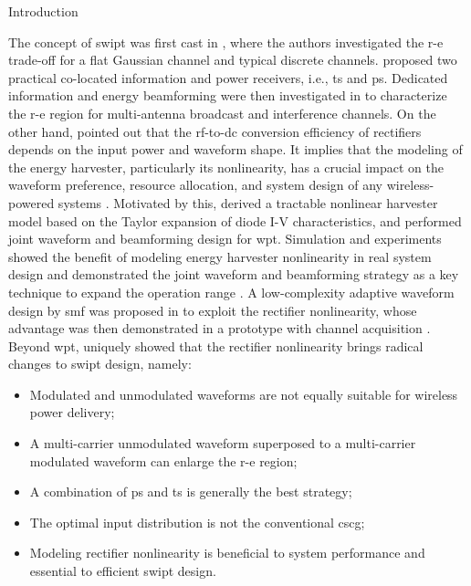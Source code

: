 \begin{section}{Introduction}
\begin{subsection}{}
		The concept of \gls{swipt} was first cast in \cite{Varshney2008}, where the authors investigated the \gls{r-e} trade-off for a flat Gaussian channel and typical discrete channels. \cite{Zhou2013} proposed two practical co-located information and power receivers, i.e., \gls{ts} and \gls{ps}. Dedicated information and energy beamforming were then investigated in \cite{Zhang2013,Park2014} to characterize the \gls{r-e} region for multi-antenna broadcast and interference channels. On the other hand, \cite{Trotter2009} pointed out that the \gls{rf}-to-\gls{dc} conversion efficiency of rectifiers depends on the input power and waveform shape. It implies that the modeling of the energy harvester, particularly its nonlinearity, has a crucial impact on the waveform preference, resource allocation, and system design of any wireless-powered systems \cite{Trotter2009,Clerckx2018,Clerckx2019}. Motivated by this, \cite{Clerckx2016a} derived a tractable nonlinear harvester model based on the Taylor expansion of diode I-V characteristics, and performed joint waveform and beamforming design for \gls{wpt}. Simulation and experiments showed the benefit of modeling energy harvester nonlinearity in real system design \cite{Kim2019,Kim2020a} and demonstrated the joint waveform and beamforming strategy as a key technique to expand the operation range \cite{Kim2021}. A low-complexity adaptive waveform design by \gls{smf} was proposed in \cite{Clerckx2017} to exploit the rectifier nonlinearity, whose advantage was then demonstrated in a prototype with channel acquisition \cite{Kim2017}. Beyond \gls{wpt}, \cite{Clerckx2018b} uniquely showed that the rectifier nonlinearity brings radical changes to \gls{swipt} design, namely:
		\begin{itemize}
			\item Modulated and unmodulated waveforms are not equally suitable for wireless power delivery;
			\item A multi-carrier unmodulated waveform superposed to a multi-carrier modulated waveform can enlarge the \gls{r-e} region;
			\item A combination of \gls{ps} and \gls{ts} is generally the best strategy;
			\item The optimal input distribution is not the conventional \gls{cscg};
			\item Modeling rectifier nonlinearity is beneficial to system performance and essential to efficient \gls{swipt} design.
		\end{itemize}

\end{subsection}
\end{section}
